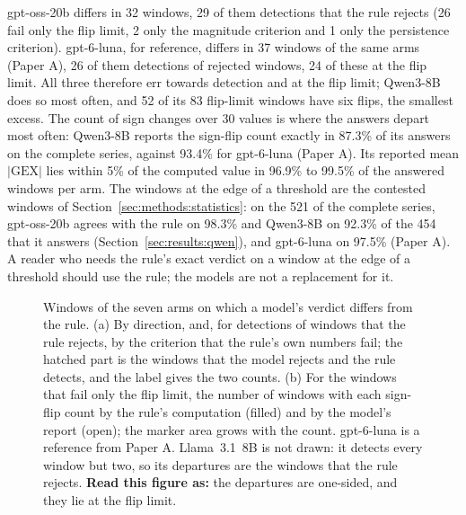 gpt-oss-20b differs in 32 windows, 29 of them detections that the rule rejects (26 fail only the flip limit, 2 only the magnitude criterion and 1 only the persistence criterion). gpt-6-luna, for reference, differs in 37 windows of the same arms (Paper A), 26 of them detections of rejected windows, 24 of these at the flip limit. All three therefore err towards detection and at the flip limit; Qwen3-8B does so most often, and 52 of its 83 flip-limit windows have six flips, the smallest excess. The count of sign changes over 30 values is where the answers depart most often: Qwen3-8B reports the sign-flip count exactly in 87.3\% of its answers on the complete series, against 93.4\% for gpt-6-luna (Paper A). Its reported mean $|\mathrm{GEX}|$ lies within 5\% of the computed value in 96.9\% to 99.5\% of the answered windows per arm. The windows at the edge of a threshold are the contested windows of Section~\ref{sec:methods:statistics}: on the 521 of the complete series, gpt-oss-20b agrees with the rule on 98.3\% and Qwen3-8B on 92.3\% of the 454 that it answers (Section~\ref{sec:results:qwen}), and gpt-6-luna on 97.5\% (Paper A). A reader who needs the rule's exact verdict on a window at the edge of a threshold should use the rule; the models are not a replacement for it.

\begin{figure}[!t]
\centering
\resultfigure{\figDepart}
\caption{Windows of the seven arms on which a model's verdict differs from the rule. (a) By direction, and, for detections of windows that the rule rejects, by the criterion that the rule's own numbers fail; the hatched part is the windows that the model rejects and the rule detects, and the label gives the two counts. (b) For the windows that fail only the flip limit, the number of windows with each sign-flip count by the rule's computation (filled) and by the model's report (open); the marker area grows with the count. gpt-6-luna is a reference from Paper A. Llama~3.1~8B is not drawn: it detects every window but two, so its departures are the windows that the rule rejects. \textbf{Read this figure as:} the departures are one-sided, and they lie at the flip limit.}
\label{fig:depart}
\end{figure}
